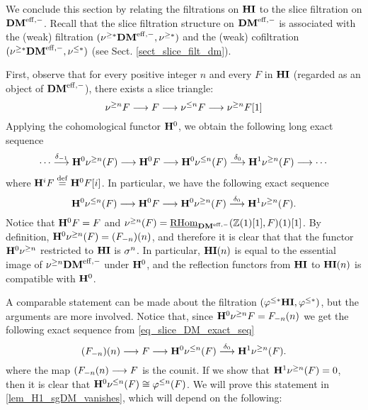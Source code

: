We conclude this section by relating the filtrations on $\HI$
to the slice filtration on $\DMeff$. Recall that the slice 
filtration structure on $\DMeff$ is associated with the (weak) 
filtration $(\sgDM{*}\DMeff, \sgDM{*})$ and the (weak) 
cofiltration $(\sgDM{*}\DMeff, \slDM{*})$ (see Sect. 
\ref{sect_slice_filt_dm}).

First, observe that for every positive integer $n$ and every $F$ 
in $\HI$ (regarded as an object of $\DMeff$), there exists a slice 
triangle:
\[
\sliceTriangle{n}{F}
\]
Applying the cohomological functor $\HH^0$, we obtain the
following long exact sequence
\[
\cdots \stackrel{\delta_{-1}}{\to} \HH^0 \sgDM{n}(F) \to 
   \HH^0 F \to \HH^0 \slDM{n}(F)
   \stackrel{\delta_0}{\to} \HH^1 \sgDM{n}(F) \to \cdots
\]
where $\HH^i F \defeq \HH^0F[i]$. In particular, we
have the following exact sequence
\begin{equation}\label{eq_slice_DM_exact_seq}
\HH^0 \slDM{n}(F) \to \HH^0 F \to \HH^0 
\sgDM{n}(F) \stackrel{\delta_0}{\to} \HH^1 \sgDM{n}(F).
\end{equation}
Notice that $\HH^0F = F$ and $\sgDM{n}(F) = 
\ihomDMf(\Z(1)[1], F)(1)[1]$. By definition, $\HH^0 \sgDM{n}(F) 
= \LHI[n]{(\RHI[n]{F})}$, and therefore it is clear that
that the functor $\HH^0 \sgDM{n}$ restricted to $\HI$ is 
$\sgHI{n}$. In particular, $\HI(n)$ is equal to the essential
image of $\sgDM{n}\DMeff$ under $\HH^0$, and the reflection 
functors from $\HI$ to $\HI(n)$ is compatible with $\HH^0$.

A comparable statement can be made about the filtration 
$(\tlHI{*}\HI, \tlHI{*})$, but the arguments are more involved.
Notice that, since $\HH^0\sgDM{n}F = \LHI[n]{\RHI[n]{F}}$ we get 
the following exact sequence from \eqref{eq_slice_DM_exact_seq}
\[
\LHI[n]{(\RHI[n]{F})} \to F \to \HH^0{\slDM{n}(F)} 
   \stackrel{\delta_0}{\to} \HH^1 \sgDM{n}(F).
\]
where the map $\LHI[n]{(\RHI[n]{F}} \to F$ is the counit. If we 
show that $\HH^1 \sgDM{n}(F) = 0$, then it is clear that
$\HH^0 \slDM{n}(F) \cong \tlHI{n}(F)$. We will prove this 
statement in \ref{lem_H1_sgDM_vanishes}, which will depend
on the following:


